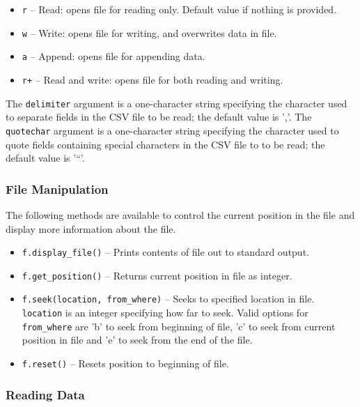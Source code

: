 \documentclass[a4paper,11pt]{report}
\begin{document}
\begin{itemize}
 \item \verb|r| -- Read: opens file for reading only. Default value if nothing is provided.
 \item \verb|w| -- Write: opens file for writing, and overwrites data in file.
 \item \verb|a| -- Append: opens file for appending data.
 \item \verb|r+| -- Read and write: opens file for both reading and writing.
\end{itemize}

The \verb|delimiter| argument is a one-character string specifying the character used to separate 
fields in the CSV file to be read; the default value is ','. The \verb|quotechar| argument is a 
one-character string specifying the character used to quote fields containing special characters 
in the CSV file to to be read; the default value is '``'.

\subsubsection{File Manipulation}

The following methods are available to control the current position in the file and display more 
information about the file.
\begin{itemize}
 \item \verb|f.display_file()| -- Prints contents of file out to standard output.

 \item \verb|f.get_position()| -- Returns current position in file as integer.

 \item \verb|f.seek(location, from_where)| -- Seeks to specified location in file. \verb|location| is
an integer specifying how far to seek. Valid options for \verb|from_where| are 'b' to seek from beginning
of file, 'c' to seek from current position in file and 'e' to seek from the end of the file.

 \item \verb|f.reset()| -- Resets position to beginning of file.

\end{itemize}

\subsubsection{Reading Data}
\end{document}

